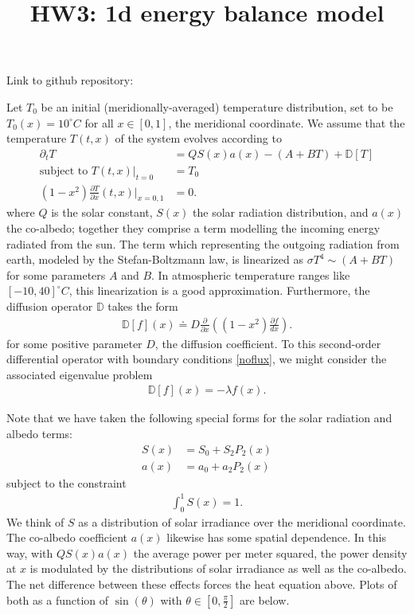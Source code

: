 \documentclass{article}
\title{HW3: 1d energy balance model}
\theoremstyle{remark}
\newcommand{\D}{ \partial }
\begin{document}
\maketitle
Link to github repository: 


Let $T_0$ be an initial (meridionally-averaged) temperature distribution, set to be 
$T_0(x) = 10^\circ C$ for all $x \in [0,1]$, the meridional coordinate. We assume that
the temperature $T(t,x)$ of the system evolves according to
\begin{align}
	\D_t T & = QS(x)a(x) - (A+BT) + \mathbb{D}[T]	\label{heat_eq} \\
	\text{subject to } T(t,x)\Big|_{t=0} & = T_0		\label{ic}		\\
	(1-x^2)\frac{\D T}{\D x}(t,x)\Big|_{x=0,1} & = 0	\label{noflux}.
\end{align}
where $Q$ is the solar constant, $S(x)$ the solar radiation distribution, and $a(x)$
the co-albedo; together they comprise a term modelling the incoming energy radiated from the sun. 
The term which representing the outgoing radiation from earth,
modeled by the Stefan-Boltzmann law, is linearized as $\sigma T^4 \sim (A+BT)$ for some 
parameters $A$ and $B$. In atmospheric temperature ranges like $[-10,40]^\circ C$,
this linearization is a good approximation. Furthermore, the diffusion operator $\mathbb{D}$
takes the form
\begin{align}
	\mathbb{D}[f](x) \doteq D\frac{\D}{\D x}\left( (1-x^2) \frac{\D f}{dx} \right).
\end{align}
for some positive parameter $D$, the diffusion coefficient.
To this second-order differential operator with boundary conditions \eqref{noflux}, 
we might consider the associated eigenvalue problem
\begin{align}\label{eigenvalue_prob}
	\mathbb{D}[f](x) = -\lambda f(x).
\end{align}

Note that we have taken the following special forms for the solar radiation and albedo
terms:
\begin{align}
	S(x) & = S_0 + S_2 P_2(x)	\\
	a(x) & = a_0 + a_2 P_2(x)
\end{align}
subject to the constraint
\begin{align}
	\int_0^1 S(x) = 1.
\end{align}
We think of $S$ as a distribution of solar irradiance over the meridional coordinate. The
co-albedo coefficient $a(x)$ likewise has some spatial dependence. In this way,
with $QS(x)a(x)$ the average power per meter squared, the power density at $x$ is modulated 
by the distributions of solar irradiance as well as the co-albedo. 
The net difference between these effects forces the heat equation above.
Plots of both as a function of $\sin(\theta)$ with $\theta \in [0,\frac{\pi}{2}]$ are below.
\end{document}
